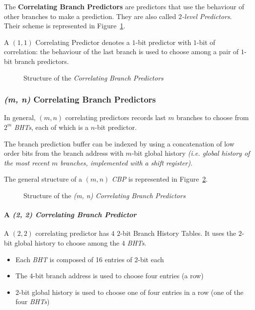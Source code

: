 \documentclass[english]{article}
\begin{document}
The \textbf{Correlating Branch Predictors} are predictors that use the behaviour of other branches to make a prediction.
They are also called \textit{\(2\)-level Predictors}.
Their scheme is represented in Figure~\ref{fig:structure-of-CBP}.

A \((1, 1)\) Correlating Predictor denotes a \(1\)-bit predictor with \(1\)-bit of correlation: the behaviour of the last branch is used to choose among a pair of \(1\)-bit branch predictors.

\begin{figure}[htbp]
  \bigskip
  \centering
  \caption{Structure of the \textit{Correlating Branch Predictors}}
  \label{fig:structure-of-CBP}
  \bigskip
\end{figure}

\subsubsection{\textit{(m, n)} Correlating Branch Predictors}

In general, \((m, n)\) correlating predictors records last \(m\) branches to choose from \(2^m\) \textit{BHTs}, each of which is a \(n\)-bit predictor.

The branch prediction buffer can be indexed by using a concatenation of low order bits from the branch address with \(m\)-bit global history \textit{(i.e. global history of the most recent \(m\) branches, implemented with a shift register)}.

The general structure of a \((m, n)\) \textit{CBP} is represented in Figure~\ref{fig:m-n-CBP}.

\begin{figure}[htbp]
  \bigskip
  \centering
  \caption{Structure of the \textit{(m, n) Correlating Branch Predictors}}
  \label{fig:m-n-CBP}
  \bigskip
\end{figure}

\paragraph{A \textit{(2, 2) Correlating Branch Predictor}}

A \((2, 2)\) correlating predictor has \(4\) \(2\)-bit Branch History Tables.
It uses the \(2\)-bit global history to choose among the \(4\) \textit{BHTs}.

\begin{itemize}
  \item Each \textit{BHT} is composed of 16 entries of \(2\)-bit each
  \item The \(4\)-bit branch address is used to choose four entries (a row)
  \item \(2\)-bit global history is used to choose one of four entries in a row (one of the four \textit{BHTs})
\end{itemize}
\end{document}
